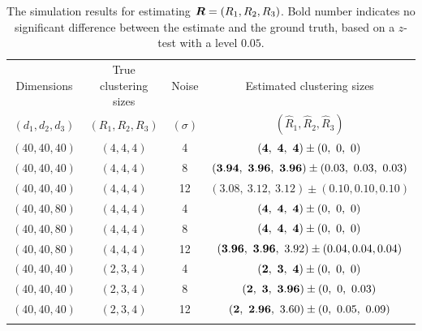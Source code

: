 \documentclass{article}
\begin{document}
\begin{appendices}
\begin{table}[http]


	\centering	

	\begin{tabular}{c|c|c|c}
		\hline
		Dimensions &True clustering sizes&Noise&Estimated clustering sizes\\ 
$(d_1,d_2,d_3)$&$(R_1,R_2,R_3)$&$(\sigma)$&$(\hat R_1,\hat R_2,\hat R_3)$\\
		\hline
		$(40,40,40)$&$(4,4,4)$&4&$({\bf 4},\ {\bf 4},\ {\bf 4})\pm (0,\ 0,\ 0)$\\
		$(40,40,40)$&$(4,4,4)$&8&$({\bf 3.94},\ {\bf 3.96},\ {\bf 3.96})\pm (0.03,\ 0.03,\ 0.03)$\\
		$(40,40,40)$&$(4,4,4)$&12&$(3.08,\ 3.12,\ 3.12)\pm (0.10,0.10,0.10)$\\
		\hline
		$(40,40,80)$&$(4,4,4)$&4&$({\bf 4},\ {\bf 4},\ {\bf 4})\pm (0,\ 0,\ 0)$\\
		$(40,40,80)$&$(4,4,4)$&8&$({\bf 4},\ {\bf 4},\ {\bf 4})\pm (0,\ 0,\ 0)$\\
		$(40,40,80)$&$(4,4,4)$&12&$({\bf 3.96},\ {\bf 3.96},\ 3.92)\pm (0.04,0.04,0.04)$\\
			\hline
		$(40,40,40)$&$(2,3,4)$&4&$({\bf 2},\ {\bf 3},\ {\bf 4})\pm (0,\ 0,\ 0)$\\
		$(40,40,40)$&$(2,3,4)$&8&$({\bf 2},{\bf \ 3},\ {\bf 3.96})\pm (0,\ 0,\ 0.03)$ \\
		$(40,40,40)$&$(2,3,4)$&12&$({\bf 2},\ {\bf 2.96},\ 3.60)\pm (0,\ 0.05,\ 0.09)$\\
\vspace{.1cm}
	\end{tabular}
		\caption{The simulation results for estimating $\bm{R}=(R_1,R_2,R_3)$. Bold number indicates no significant difference between the estimate and the ground truth, based on a $z$-test with a level $0.05$.}\label{tab:rank}
\end{table}


\end{appendices}
\end{document}
